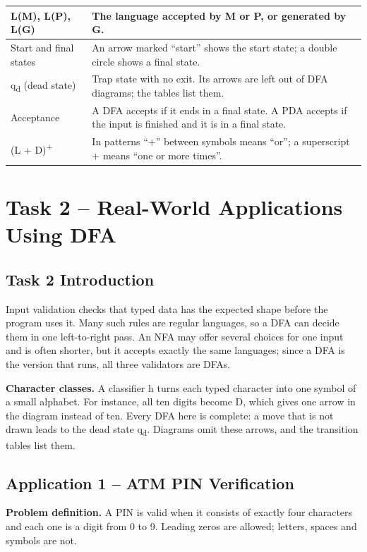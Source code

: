\documentclass[12pt,a4paper]{article}
\begin{document}
{\begin{longtable}{|>{\raggedright\arraybackslash}p{}|>{\raggedright\arraybackslash}p{}|}
L(M), L(P), L(G) & The language accepted by M or P, or generated by G.\\ \hline
Start and final states & An arrow marked ``start'' shows the start state; a double circle shows a final state.\\ \hline
q\textsubscript{d} (dead state) & Trap state with no exit. Its arrows are left out of DFA diagrams; the tables list them.\\ \hline
Acceptance & A DFA accepts if it ends in a final state. A PDA accepts if the input is finished and it is in a final state.\\ \hline
(L + D)\textsuperscript{+} & In patterns ``+'' between symbols means ``or''; a superscript + means ``one or more times''.\\ \hline
\end{longtable}}

\section{Task 2 -- Real-World Applications Using DFA}

\subsection{Task 2 Introduction}

Input validation checks that typed data has the expected shape before the program uses it. Many such rules are regular languages, so a DFA can decide them in one left-to-right pass. An NFA may offer several choices for one input and is often shorter, but it accepts exactly the same languages; since a DFA is the version that runs, all three validators are DFAs.

\textbf{Character classes.} A classifier h turns each typed character into one symbol of a small alphabet. For instance, all ten digits become D, which gives one arrow in the diagram instead of ten. Every DFA here is complete: a move that is not drawn leads to the dead state q\textsubscript{d}. Diagrams omit these arrows, and the transition tables list them.

\subsection{Application 1 -- ATM PIN Verification}

\textbf{Problem definition.} A PIN is valid when it consists of exactly four characters and each one is a digit from 0 to 9. Leading zeros are allowed; letters, spaces and symbols are not.
\end{document}
